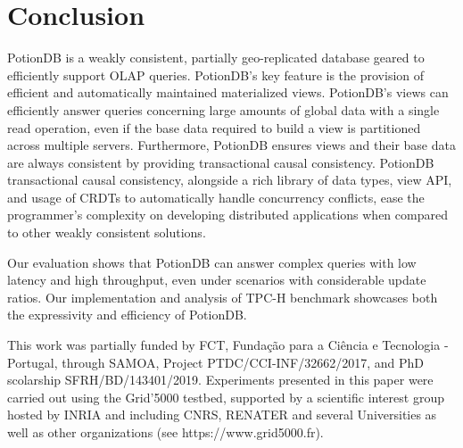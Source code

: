 \documentclass[sigplan,review,anonymous]{acmart}
\begin{document}

\section{Conclusion}
\label{sec:conclusion}

PotionDB is a weakly consistent, partially geo-replicated database geared to efficiently support OLAP queries.
PotionDB’s key feature is the provision of efficient and automatically maintained materialized views.
PotionDB’s views can efficiently answer queries concerning large amounts of global data with a single read operation, even if the base data required to build a view is partitioned across multiple servers.
Furthermore, PotionDB ensures views and their base data are always consistent by providing transactional causal consistency.
PotionDB transactional causal consistency, alongside a rich library of data types, view API, and usage of CRDTs to automatically handle concurrency conflicts, ease the programmer’s complexity on developing distributed applications 
when compared to other weakly consistent solutions.

Our evaluation shows that PotionDB can answer complex queries with low latency and high throughput, 
even under scenarios with considerable update ratios.
Our implementation and analysis of TPC-H benchmark showcases both the expressivity and efficiency of PotionDB.


\begin{acks}
This work was partially funded by FCT, Fundação para a Ciência e Tecnologia - Portugal, through SAMOA, Project PTDC/CCI-INF/32662/2017, and PhD scolarship SFRH/BD/143401/2019.
Experiments presented in this paper were carried out using the Grid'5000 testbed, supported by a scientific interest group hosted by INRIA and including CNRS, RENATER and several Universities as well as other organizations (see https://www.grid5000.fr).
\end{acks}




\balance

%


\end{document}
